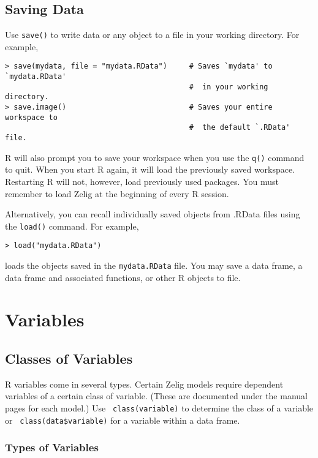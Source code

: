 \documentclass{article}
\begin{document}
\subsection{Saving Data}\label{s:save}

Use \texttt{save()} to write data or any object to a file in your
working directory.  For example,
\begin{verbatim}
> save(mydata, file = "mydata.RData")     # Saves `mydata' to `mydata.RData'
                                          #  in your working directory.  
> save.image()                            # Saves your entire workspace to
                                          #  the default `.RData' file.
\end{verbatim}
R will also prompt you to save your workspace when you use the
\texttt{q()} command to quit.  When you start R again, it will load
the previously saved workspace.  Restarting R will not, however, load
previously used packages.  You must remember to load Zelig at the
beginning of every R session.

Alternatively, you can recall individually saved objects from .RData
files using the {\tt load()} command.  For example,
\begin{verbatim}
> load("mydata.RData") 
\end{verbatim}
loads the objects saved in the {\tt mydata.RData} file.  You may save
a data frame, a data frame and associated functions, or other R
objects to file.

\section{Variables}

\subsection{Classes of Variables}

R variables come in several types.  Certain Zelig models require
dependent variables of a certain class of variable.  (These are
documented under the manual pages for each model.)  Use {\tt
  class(variable)} to determine the class of a variable or {\tt
  class(data\$variable)} for a variable within a data frame.  %

\subsubsection*{Types of Variables} \label{variable.classes}
\end{document}
